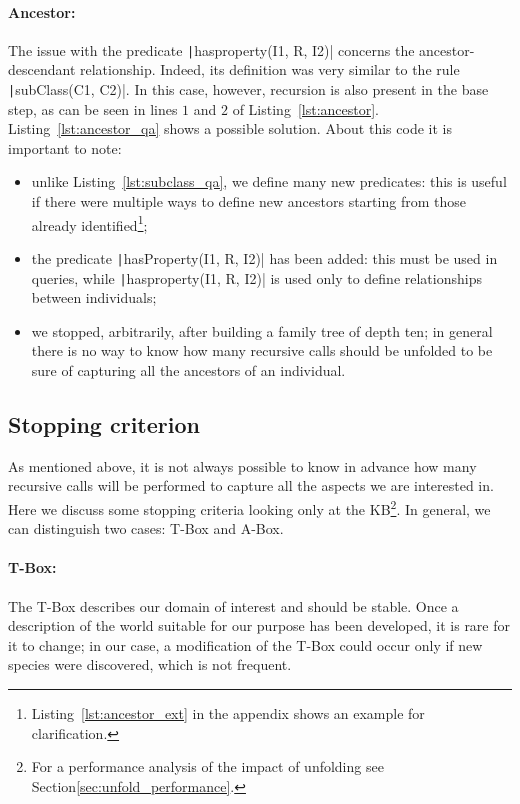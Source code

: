 \paragraph{Ancestor:} The issue with the predicate \texttt|hasproperty(I1, R, I2)| concerns the ancestor-descendant relationship. Indeed, its definition was very similar to the rule \texttt|subClass(C1, C2)|. In this case, however, recursion is also present in the base step, as can be seen in lines $1$ and $2$ of Listing~\ref{lst:ancestor}. Listing~\ref{lst:ancestor_qa} shows a possible solution. About this code it is important to note:
\begin{itemize}
	\item unlike Listing~\ref{lst:subclass_qa}, we define many new predicates: this is useful if there were multiple ways to define new ancestors starting from those already identified\footnote{Listing~\ref{lst:ancestor_ext} in the appendix shows an example for clarification.};
	\item the predicate \texttt|hasProperty(I1, R, I2)| has been added: this must be used in queries, while \texttt|hasproperty(I1, R, I2)| is used only to define relationships between individuals;
	\item we stopped, arbitrarily, after building a family tree of depth ten; in general there is no way to know how many recursive calls should be unfolded to be sure of capturing all the ancestors of an individual.
\end{itemize}

\begin{listing}[h]
	\caption{Ancestor unfolding}
	\label{lst:ancestor_qa}
\end{listing}

\subsection{Stopping criterion}
As mentioned above, it is not always possible to know in advance how many recursive calls will be performed to capture all the aspects we are interested in. Here we discuss some stopping criteria looking only at the KB\footnote{For a performance analysis of the impact of unfolding see Section\ref{sec:unfold_performance}.}. In general, we can distinguish two cases: T-Box and A-Box.

\paragraph{T-Box:} The T-Box describes our domain of interest and should be stable. Once a description of the world suitable for our purpose has been developed, it is rare for it to change; in our case, a modification of the T-Box could occur only if new species were discovered, which is not frequent.

